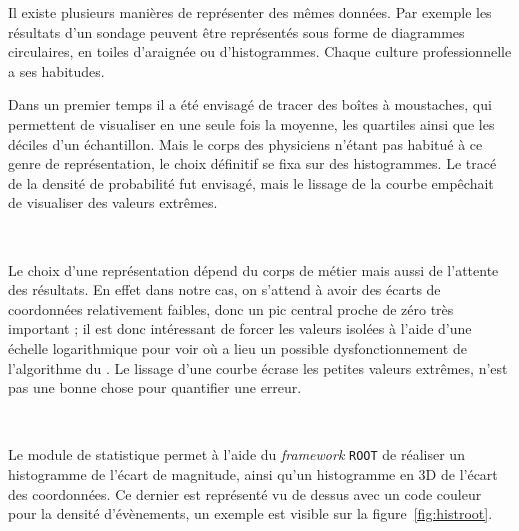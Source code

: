 Il existe plusieurs manières de représenter des mêmes données. Par exemple les résultats d'un sondage peuvent être représentés sous forme de diagrammes circulaires, en toiles d'araignée ou d'histogrammes. Chaque culture professionnelle a ses habitudes.

Dans un premier temps il a été envisagé de tracer des boîtes à moustaches, qui permettent de visualiser en une seule fois la moyenne, les quartiles ainsi que les déciles d'un échantillon. Mais le corps des physiciens n'étant pas habitué à ce genre de représentation, le choix définitif se fixa sur des histogrammes. Le tracé de la densité de probabilité fut envisagé, mais le lissage de la courbe empêchait de visualiser des valeurs extrêmes.

\

Le choix d'une représentation dépend du corps de métier mais aussi de l'attente des résultats. En effet dans notre cas, on s'attend à avoir des écarts de coordonnées relativement faibles, donc un pic central proche de zéro très important ; il est donc intéressant de forcer les valeurs isolées à l'aide d'une échelle logarithmique pour voir où a lieu un possible dysfonctionnement de l'algorithme du \stack{}. Le lissage d'une courbe écrase les petites valeurs extrêmes, n'est pas une bonne chose pour quantifier une erreur.

\

Le module de statistique permet à l'aide du \emph{framework} \texttt{ROOT} de réaliser un histogramme de l'écart de magnitude, ainsi qu'un histogramme en 3D de l'écart des coordonnées. Ce dernier est représenté vu de dessus avec un code couleur pour la densité d'évènements, un exemple est visible sur la figure~\ref{fig:histroot}.

